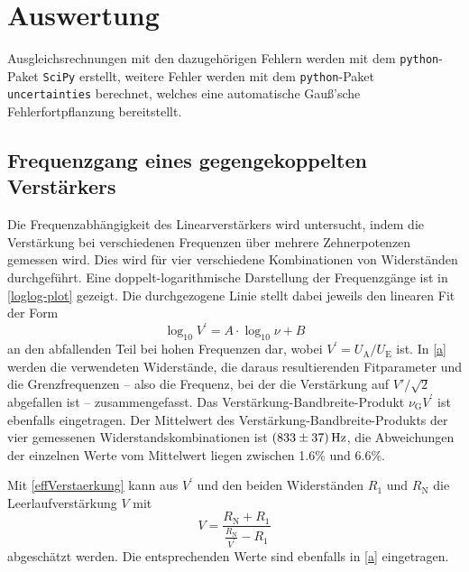 \section{Auswertung}
\label{sec:evaluation}
Ausgleichsrechnungen mit den dazugehörigen Fehlern werden mit dem \texttt{python}-Paket \texttt{SciPy} \cite{scipy} erstellt, weitere Fehler werden mit dem \texttt{python}-Paket \texttt{uncertainties} \cite{uncertain} berechnet, welches eine automatische Gauß'sche Fehlerfortpflanzung bereitstellt.

\subsection{Frequenzgang eines gegengekoppelten Verstärkers}
\label{Frequenzgang}
Die Frequenzabhängigkeit des Linearverstärkers wird untersucht, indem die Verstärkung bei verschiedenen Frequenzen über mehrere Zehnerpotenzen gemessen wird. Dies wird für vier verschiedene Kombinationen von Widerständen durchgeführt. Eine doppelt-logarithmische Darstellung der Frequenzgänge ist in \autoref{loglog-plot} gezeigt. Die durchgezogene Linie stellt dabei jeweils den linearen Fit der Form
\begin{equation}
	\log_{10} V^\prime = A \cdot \log_{10} \nu + B
	\label{linear_fit}
\end{equation}
an den abfallenden Teil bei hohen Frequenzen dar, wobei $V^\prime = U_\text{A} / U_\text{E}$ ist. In \autoref{a} werden die verwendeten Widerstände, die daraus resultierenden Fitparameter und die Grenzfrequenzen -- also die Frequenz, bei der die Verstärkung auf $V'/\sqrt{2}$ abgefallen ist -- zusammengefasst. Das Verstärkung-Bandbreite-Produkt $\nu_\text{G}V^\prime$ ist ebenfalls eingetragen. Der Mittelwert des Verstärkung-Bandbreite-Produkts der vier gemessenen Widerstandskombinationen ist $\SI{833 \pm 37}{\hertz}$, die Abweichungen der einzelnen Werte vom Mittelwert liegen zwischen 1.6\% und 6.6\%.\par
Mit \autoref{effVerstaerkung} kann aus $V^\prime$ und den beiden Widerständen $R_1$ und $R_\text{N}$ die Leerlaufverstärkung $V$ mit
\begin{equation}
	V = \frac{R_\text{N} + R_1}{\frac{R_\text{N}}{V^\prime} - R_1}
\end{equation}
abgeschätzt werden. Die entsprechenden Werte sind ebenfalls in \autoref{a} eingetragen.

